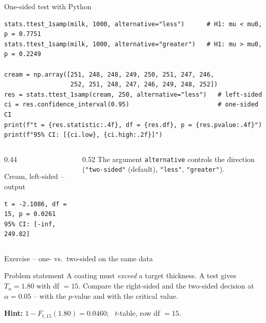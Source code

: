 \documentclass[aspectratio=169,11pt]{beamer}
\begin{document}
\begin{frame}[fragile]{One-sided test with Python}
\begin{lstlisting}
stats.ttest_1samp(milk, 1000, alternative="less")      # H1: mu < mu0, p = 0.7751
stats.ttest_1samp(milk, 1000, alternative="greater")   # H1: mu > mu0, p = 0.2249

cream = np.array([251, 248, 248, 249, 250, 251, 247, 246,
                  252, 251, 248, 247, 246, 249, 248, 252])
res = stats.ttest_1samp(cream, 250, alternative="less")   # left-sided
ci = res.confidence_interval(0.95)                        # one-sided CI
print(f"t = {res.statistic:.4f}, df = {res.df}, p = {res.pvalue:.4f}")
print(f"95% CI: [{ci.low}, {ci.high:.2f}]")
\end{lstlisting}
  \begin{columns}[T]
    \begin{column}{0.44\textwidth}
      \begin{block}{Cream, left-sided -- output}
\begin{lstlisting}[style=Pyout]
t = -2.1086, df = 15, p = 0.0261
95% CI: [-inf, 249.82]
\end{lstlisting}
      \end{block}
    \end{column}
    \begin{column}{0.52\textwidth}
      \footnotesize The argument \texttt{alternative} controls the
      direction (\texttt{"two-sided"} (default), \texttt{"less"},
      \texttt{"greater"}).
    \end{column}
  \end{columns}
\end{frame}

\begin{frame}{Exercise -- one- vs.\ two-sided on the same data}
  \begin{block}{Problem statement}
    A coating must \emph{exceed} a target thickness. A test gives
    $T_n = 1.80$ with df $=15$. Compare the right-sided and the two-sided
    decision at $\alpha = 0.05$ -- with the $p$-value and with the critical
    value.
  \end{block}
  \textbf{Hint:} $1-F_{t,15}(1.80) = 0.0460$; \ $t$-table, row df $=15$.
\end{frame}
\end{document}
